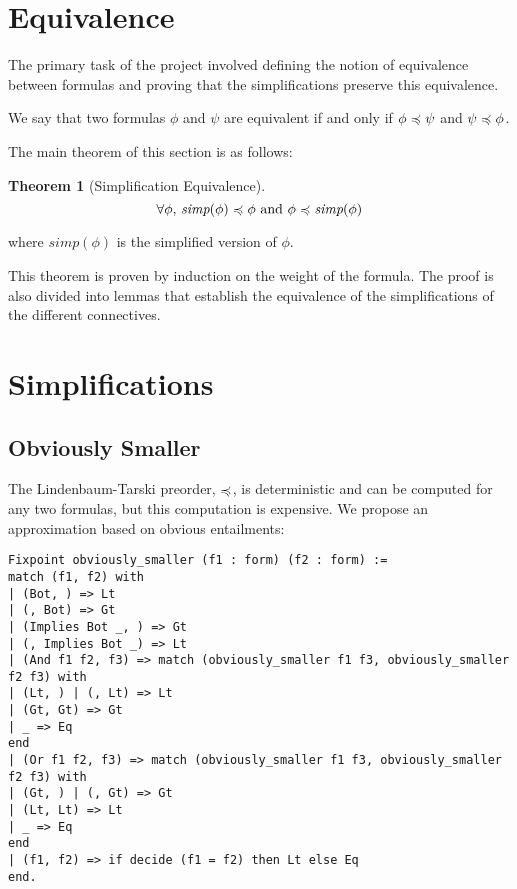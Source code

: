 \documentclass{article}
\newtheorem{theorem}{Theorem}[section]
\begin{document}
\section{Equivalence}

The primary task of the project involved defining the notion of equivalence between formulas and proving that the simplifications preserve this equivalence.

We say that two formulas $\phi$ and $\psi$ are equivalent if and only if $\phi \preccurlyeq \psi$ and $\psi \preccurlyeq \phi$.

The main theorem of this section is as follows:

\begin{theorem}[Simplification Equivalence]
	\[
		\forall \phi,\, \textit{simp}(\phi) \preccurlyeq \phi \text{ and } \phi \preccurlyeq \textit{simp}(\phi)
	\]
\end{theorem}

where $\textit{simp}(\phi)$ is the simplified version of $\phi$.

This theorem is proven by induction on the weight of the formula. The proof is also divided into lemmas that
establish the equivalence of the simplifications of the different connectives.

\section{Simplifications}

\subsection{Obviously Smaller}

The Lindenbaum-Tarski preorder, $\preccurlyeq$, is deterministic and can be computed for any two formulas, but this
computation is expensive. We propose an approximation based on obvious entailments:

\begin{lstlisting}[language=Coq]
Fixpoint obviously_smaller (f1 : form) (f2 : form) :=
match (f1, f2) with
| (Bot, ) => Lt
| (, Bot) => Gt
| (Implies Bot _, ) => Gt
| (, Implies Bot _) => Lt
| (And f1 f2, f3) => match (obviously_smaller f1 f3, obviously_smaller f2 f3) with
| (Lt, ) | (, Lt) => Lt
| (Gt, Gt) => Gt
| _ => Eq
end
| (Or f1 f2, f3) => match (obviously_smaller f1 f3, obviously_smaller f2 f3) with
| (Gt, ) | (, Gt) => Gt
| (Lt, Lt) => Lt
| _ => Eq
end
| (f1, f2) => if decide (f1 = f2) then Lt else Eq
end.
\end{lstlisting}
\end{document}
